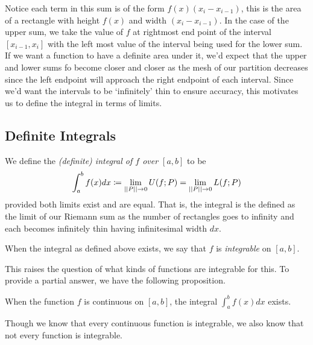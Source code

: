 Notice each term in this sum is of the form $f(x)(x_i-x_{i-1})$, this is the area of a rectangle with height $f(x)$ and width $(x_i-x_{i-1})$. In the case of the upper sum, we take the value of $f$ at rightmost end point of the interval $[x_{i-1},x_i]$ with the left most value of the interval being used for the lower sum. If we want a function to have a definite area under it, we'd expect that the upper and lower sums fo become closer and closer as the mesh of our partition decreases since the left endpoint will approach the right endpoint of each interval. Since we'd want the intervals to be `infinitely' thin to ensure accuracy, this motivates us to define the integral in terms of limits.

\subsection{Definite Integrals}

\begin{defn}\label{DefInt}
We define the \emph{(definite) integral of $f$ over $[a,b]$} to be
\begin{equation}
  \int_{a}^{b}f(x)dx\coloneqq \lim\limits_{\left|\left| P \right|\right|\to 0}U(f;P)=\lim\limits_{\left|\left| P \right|\right|\to 0}L(f;P)
\end{equation}
provided both limits exist and are equal. That is, the integral is the defined as the limit of our Riemann sum as the number of rectangles goes to infinity and each becomes infinitely thin having infinitesimal width $dx$.
\end{defn}
\begin{rem}
When the integral as defined above exists, we say that $f$ is \emph{integrable} on $[a,b]$.
\end{rem}

This raises the question of what kinds of functions are integrable for this. To provide a partial answer, we have the following proposition.
\begin{prop}\label{IntExists}
    When the function $f$ is continuous on $[a,b]$, the integral $\int_{a}^{b}f(x)dx$ exists.
\end{prop}
Though we know that every continuous function is integrable, we also know that not every function is integrable.

